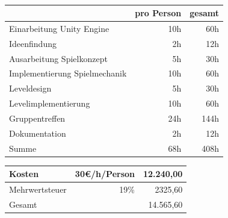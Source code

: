 \documentclass[10pt,a4paper,notitlepage]{report}
\begin{document}
	
	\\\par\medskip\Text
	\begin{center}
	\begin{tabular}{l|r|r}\hline
		 & pro Person & gesamt\\\hline
		Einarbeitung Unity Engine & 10h & 60h\\\hline
		Ideenfindung & 2h & 12h\\\hline
		Ausarbeitung Spielkonzept & 5h & 30h\\\hline
		Implementierung Spielmechanik & 10h & 60h\\\hline
		Leveldesign & 5h & 30h\\\hline
		Levelimplementierung & 10h & 60h\\\hline
		Gruppentreffen & 24h & 144h\\\hline
		Dokumentation & 2h & 12h\\\hline\hline
		Summe & 68h & 408h\\\hline
	\end{tabular}
	\par\bigskip
	\begin{tabular}{l|r|r}\hline
		Kosten & 30€/h/Person & 12.240,00\texteuro \\\hline
		Mehrwertsteuer& 19\% & 2325,60\texteuro \\\hline
		Gesamt & & 14.565,60\texteuro \\\hline
	\end{tabular}
	\end{center}\par\smallskip
	
	\clearpage
	\marginpar{\vspace{3.0mm} \color{orange}\rule{0.8mm}{53.3mm} \\[3mm] \color{hellorange}\rule{0.8mm}{170mm}}
	\par\bigskip
	
\end{document}
